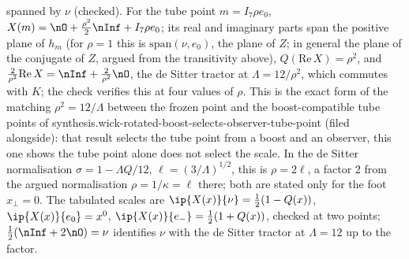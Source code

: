 spanned by $\nu$ (checked). For the tube point $m = I_{7}\rho e_{0}$, $X(m) = \nO + \tfrac{\rho^{2}}{2}\nInf + I_{7}\rho e_{0}$; its real and imaginary parts span the positive plane of $h_{m}$ (for $\rho = 1$ this is $\mathrm{span}(\nu, e_{0})$, the plane of $Z$; in general the plane of the conjugate of $Z$, argued from the transitivity above), $Q(\mathrm{Re}\,X) = \rho^{2}$, and $\tfrac{2}{\rho^{2}}\mathrm{Re}\,X = \nInf + \tfrac{2}{\rho^{2}}\nO$, the de Sitter tractor at $\Lambda = 12/\rho^{2}$, which commutes with $K$; the check verifies this at four values of $\rho$. This is the exact form of the matching $\rho^{2} = 12/\Lambda$ between the frozen point and the boost-compatible tube points of synthesis.wick-rotated-boost-selects-observer-tube-point (filed alongside): that result selects the tube point from a boost and an observer, this one shows the tube point alone does not select the scale. In the de Sitter normalisation $\sigma = 1 - \Lambda Q/12$, $\ell = (3/\Lambda)^{1/2}$, this is $\rho = 2\ell$, a factor $2$ from the argued normalisation $\rho = 1/\kappa = \ell$ there; both are stated only for the foot $x_{\perp} = 0$. The tabulated scales are $\ip{X(x)}{\nu} = \tfrac12(1 - Q(x))$, $\ip{X(x)}{e_{0}} = x^{0}$, $\ip{X(x)}{e_{-}} = \tfrac12(1 + Q(x))$, checked at two points; $\tfrac12(\nInf + 2\nO) = \nu$ identifies $\nu$ with the de Sitter tractor at $\Lambda = 12$ up to the factor.

